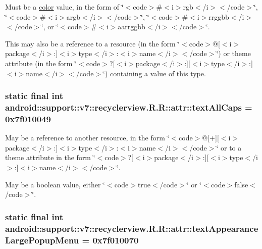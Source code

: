 Must be a \hyperlink{classandroid_1_1support_1_1v7_1_1recyclerview_1_1_r_1_1color}{color} value, in the form of \char`\"{}$<$code$>$\#$<$i$>$rgb$<$/i$>$$<$/code$>$\char`\"{}, \char`\"{}$<$code$>$\#$<$i$>$argb$<$/i$>$$<$/code$>$\char`\"{}, \char`\"{}$<$code$>$\#$<$i$>$rrggbb$<$/i$>$$<$/code$>$\char`\"{}, or \char`\"{}$<$code$>$\#$<$i$>$aarrggbb$<$/i$>$$<$/code$>$\char`\"{}. 

This may also be a reference to a resource (in the form \char`\"{}$<$code$>$@\mbox{[}$<$i$>$package$<$/i$>$:\mbox{]}$<$i$>$type$<$/i$>$:$<$i$>$name$<$/i$>$$<$/code$>$\char`\"{}) or theme attribute (in the form \char`\"{}$<$code$>$?\mbox{[}$<$i$>$package$<$/i$>$:\mbox{]}\mbox{[}$<$i$>$type$<$/i$>$:\mbox{]}$<$i$>$name$<$/i$>$$<$/code$>$\char`\"{}) containing a value of this type. \hypertarget{classandroid_1_1support_1_1v7_1_1recyclerview_1_1_r_1_1attr_d5ab66a6d60fecf3364a3c6097dca4d4}{
\subsubsection[{textAllCaps}]{\setlength{\rightskip}{0pt plus 5cm}static final int android::support::v7::recyclerview.R.R::attr::textAllCaps = 0x7f010049}}
\label{classandroid_1_1support_1_1v7_1_1recyclerview_1_1_r_1_1attr_d5ab66a6d60fecf3364a3c6097dca4d4}


May be a reference to another resource, in the form \char`\"{}$<$code$>$@\mbox{[}+\mbox{]}\mbox{[}$<$i$>$package$<$/i$>$:\mbox{]}$<$i$>$type$<$/i$>$:$<$i$>$name$<$/i$>$$<$/code$>$\char`\"{} or to a theme attribute in the form \char`\"{}$<$code$>$?\mbox{[}$<$i$>$package$<$/i$>$:\mbox{]}\mbox{[}$<$i$>$type$<$/i$>$:\mbox{]}$<$i$>$name$<$/i$>$$<$/code$>$\char`\"{}. 

May be a boolean value, either \char`\"{}$<$code$>$true$<$/code$>$\char`\"{} or \char`\"{}$<$code$>$false$<$/code$>$\char`\"{}. \hypertarget{classandroid_1_1support_1_1v7_1_1recyclerview_1_1_r_1_1attr_bbfc5754c42ec37342dc16d2cfee068d}{
\subsubsection[{textAppearanceLargePopupMenu}]{\setlength{\rightskip}{0pt plus 5cm}static final int android::support::v7::recyclerview.R.R::attr::textAppearanceLargePopupMenu = 0x7f010070}}
\label{classandroid_1_1support_1_1v7_1_1recyclerview_1_1_r_1_1attr_bbfc5754c42ec37342dc16d2cfee068d}



